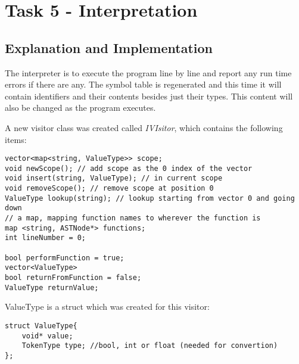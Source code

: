 \section{Task 5 - Interpretation}
\subsection{Explanation and Implementation}
The interpreter is to execute the program line by line and report any run time errors if there are any. The symbol table is regenerated and this time it will contain identifiers and their contents besides just their types. This content will also be changed as the program executes.

A new visitor class was created called \textit{IVIsitor}, which contains the following items:

\begin{lstlisting}
vector<map<string, ValueType>> scope;
void newScope(); // add scope as the 0 index of the vector
void insert(string, ValueType); // in current scope
void removeScope(); // remove scope at position 0
ValueType lookup(string); // lookup starting from vector 0 and going down
// a map, mapping function names to wherever the function is
map <string, ASTNode*> functions;
int lineNumber = 0;

bool performFunction = true;
vector<ValueType> 
bool returnFromFunction = false;
ValueType returnValue;
\end{lstlisting}
ValueType is a struct which was created for this visitor:
\begin{lstlisting}
struct ValueType{
	void* value;
	TokenType type; //bool, int or float (needed for convertion)
};
\end{lstlisting}


